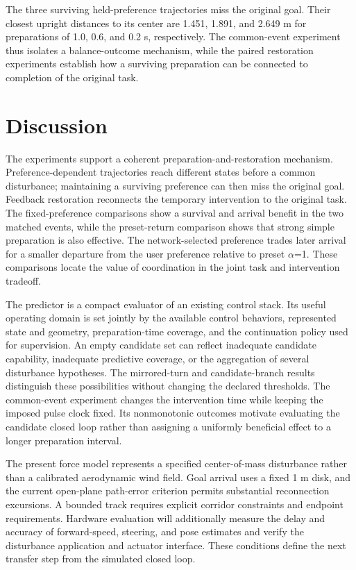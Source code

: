 \documentclass[journal]{IEEEtran}
\begin{document}
The three surviving held-preference trajectories miss the original goal. Their closest upright distances to its center are 1.451, 1.891, and 2.649 m for preparations of 1.0, 0.6, and 0.2 s, respectively. The common-event experiment thus isolates a balance-outcome mechanism, while the paired restoration experiments establish how a surviving preparation can be connected to completion of the original task.


\section{Discussion}

The experiments support a coherent preparation-and-restoration mechanism. Preference-dependent trajectories reach different states before a common disturbance; maintaining a surviving preference can then miss the original goal. Feedback restoration reconnects the temporary intervention to the original task. The fixed-preference comparisons show a survival and arrival benefit in the two matched events, while the preset-return comparison shows that strong simple preparation is also effective. The network-selected preference trades later arrival for a smaller departure from the user preference relative to preset $\alpha$=1. These comparisons locate the value of coordination in the joint task and intervention tradeoff.


The predictor is a compact evaluator of an existing control stack. Its useful operating domain is set jointly by the available control behaviors, represented state and geometry, preparation-time coverage, and the continuation policy used for supervision. An empty candidate set can reflect inadequate candidate capability, inadequate predictive coverage, or the aggregation of several disturbance hypotheses. The mirrored-turn and candidate-branch results distinguish these possibilities without changing the declared thresholds. The common-event experiment changes the intervention time while keeping the imposed pulse clock fixed. Its nonmonotonic outcomes motivate evaluating the candidate closed loop rather than assigning a uniformly beneficial effect to a longer preparation interval.


The present force model represents a specified center-of-mass disturbance rather than a calibrated aerodynamic wind field. Goal arrival uses a fixed 1 m disk, and the current open-plane path-error criterion permits substantial reconnection excursions. A bounded track requires explicit corridor constraints and endpoint requirements. Hardware evaluation will additionally measure the delay and accuracy of forward-speed, steering, and pose estimates and verify the disturbance application and actuator interface. These conditions define the next transfer step from the simulated closed loop.
\end{document}
